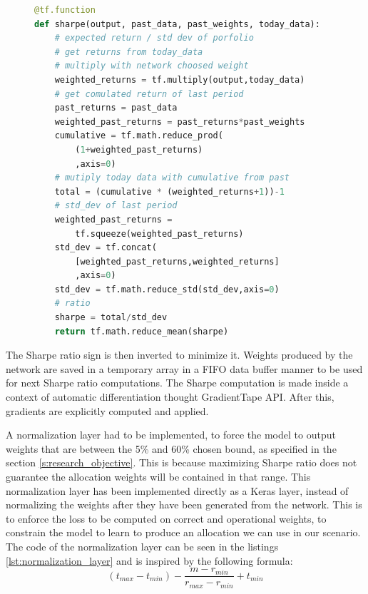 \begin{figure}[h]
\begin{lstlisting}[language=Python, caption=Python function to compute the portfolio sharpe given new assets weights from neural network, label=lst:sharpe_ratio,frame = single]
@tf.function
def sharpe(output, past_data, past_weights, today_data):
    # expected return / std dev of porfolio
    # get returns from today_data
    # multiply with network choosed weight
    weighted_returns = tf.multiply(output,today_data)
    # get comulated return of last period
    past_returns = past_data
    weighted_past_returns = past_returns*past_weights
    cumulative = tf.math.reduce_prod(
        (1+weighted_past_returns)
        ,axis=0)
    # mutiply today data with cumulative from past
    total = (cumulative * (weighted_returns+1))-1
    # std_dev of last period
    weighted_past_returns =
        tf.squeeze(weighted_past_returns)
    std_dev = tf.concat(
        [weighted_past_returns,weighted_returns]
        ,axis=0)
    std_dev = tf.math.reduce_std(std_dev,axis=0)
    # ratio
    sharpe = total/std_dev
    return tf.math.reduce_mean(sharpe)
\end{lstlisting}
\end{figure}


The Sharpe ratio sign is then inverted to minimize it.
Weights produced by the network are saved in a temporary array in a FIFO data buffer manner to be used for next Sharpe ratio computations.
The Sharpe computation is made inside a context of automatic differentiation thought GradientTape API. After this, gradients are explicitly computed and applied.

\hfill \break

A normalization layer had to be implemented, to force the model to output weights that are between the 5\% and 60\% chosen bound, as specified in the section \ref{s:research_objective}. This is because maximizing Sharpe ratio does not guarantee the allocation weights will be contained in that range. This normalization layer has been implemented directly as a Keras layer, instead of normalizing the weights after they have been generated from the network. This is to enforce the loss to be computed on correct and operational weights, to constrain the model to learn to produce an allocation we can use in our scenario. The code of the normalization layer can be seen in the listings \ref{lst:normalization_layer} and is inspired by the following formula:
$$(t_{max} - t_{min}) - \frac{m-r_{min}}{r_{max}-r_{min}} + t_{min}$$


